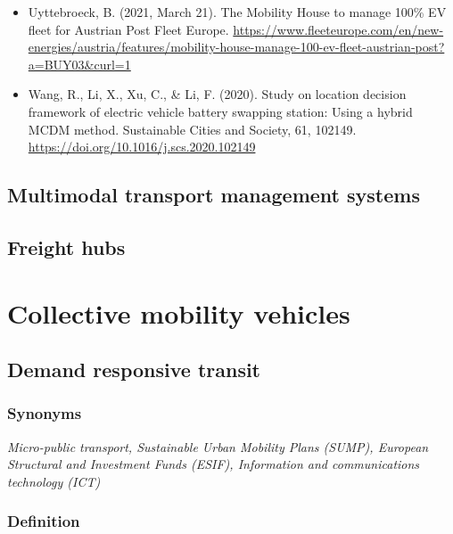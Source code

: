 \documentclass[
]{book}
\begin{document}
\begin{itemize}
\item
  Uyttebroeck, B. (2021, March 21). The Mobility House to manage 100\% EV fleet for Austrian Post \textbar{} Fleet Europe. \url{https://www.fleeteurope.com/en/new-energies/austria/features/mobility-house-manage-100-ev-fleet-austrian-post?a=BUY03\&curl=1}
\item
  Wang, R., Li, X., Xu, C., \& Li, F. (2020). Study on location decision framework of electric vehicle battery swapping station: Using a hybrid MCDM method. Sustainable Cities and Society, 61, 102149. \url{https://doi.org/10.1016/j.scs.2020.102149}
\end{itemize}

\hypertarget{mtms}{%
\section{Multimodal transport management systems}\label{mtms}}

\hypertarget{freight_hubs}{%
\section{Freight hubs}\label{freight_hubs}}

\hypertarget{collective}{%
\chapter{Collective mobility vehicles}\label{collective}}

\hypertarget{drt}{%
\section{Demand responsive transit}\label{drt}}

\hypertarget{synonyms-24}{%
\subsection*{Synonyms}\label{synonyms-24}}

\emph{Micro-public transport, Sustainable Urban Mobility Plans (SUMP), European Structural and Investment Funds (ESIF), Information and communications technology (ICT)}

\hypertarget{definition-28}{%
\subsection*{Definition}\label{definition-28}}
\end{document}
